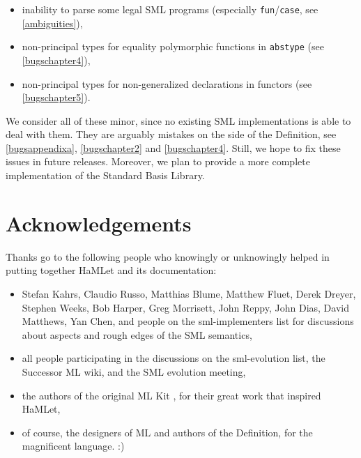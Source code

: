 \documentclass[twoside,titlepage]{article}
\begin{document}
\begin{itemize}[nolistsep]
\item inability to parse some legal SML programs (especially {\tt fun}/{\tt case}, see \ref{ambiguities}),
\item non-principal types for equality polymorphic functions in {\tt abstype} (see \ref{bugschapter4}),
\item non-principal types for non-generalized declarations in functors (see \ref{bugschapter5}).
\end{itemize}

We consider all of these minor, since no existing SML implementations is able to deal with them. They are arguably mistakes on the side of the Definition, see \ref{bugsappendixa}, \ref{bugschapter2} and \ref{bugschapter4}. Still, we hope to fix these issues in future releases. Moreover, we plan to provide a more complete implementation of the Standard Basis Library.


\section*{Acknowledgements}
\label{acknowledgements}

Thanks go to the following people who knowingly or unknowingly helped in putting together HaMLet and its documentation:

\begin{itemize}
\setlength\parskip{0pt}
\item Stefan Kahrs, Claudio Russo, Matthias Blume, Matthew Fluet, Derek Dreyer, Stephen Weeks, Bob Harper, Greg Morrisett, John Reppy, John Dias, David Matthews, Yan Chen, and people on the sml-implementers list for discussions about aspects and rough edges of the SML semantics,
\item all people participating in the discussions on the sml-evolution list, the Successor ML wiki, and the SML evolution meeting,
\item the authors of the original ML Kit \cite{kit}, for their great work that inspired HaMLet,
\item of course, the designers of ML and authors of the Definition, for the magnificent language. :)
\end{itemize}
\end{document}
